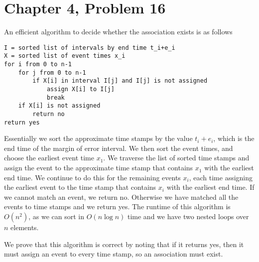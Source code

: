\documentclass[12pt]{article}
\begin{document}
\pagebreak

\section*{Chapter 4, Problem 16}

An efficient algorithm to decide whether the association exists is as follows
\begin{verbatim}
I = sorted list of intervals by end time t_i+e_i
X = sorted list of event times x_i
for i from 0 to n-1
    for j from 0 to n-1
        if X[i] in interval I[j] and I[j] is not assigned
            assign X[i] to I[j]
            break
    if X[i] is not assigned
        return no
return yes
\end{verbatim}
Essentially we sort the approximate time stamps by the value \(t_i+e_i\), which is the end time of
the margin of error interval. We then sort the event times, and choose the earliest event time \(x_1\).
We traverse the list of sorted time stamps and assign the event to the approximate time stamp that contains \(x_1\)
with the earliest end time. We continue to do this for the remaining events \(x_i\), each time assigning the earliest
event to the time stamp that contains \(x_i\) with the earliest end time. If we cannot match an event,
we return no. Otherwise we have matched all the events to time stamps and we return yes. The runtime of this algorithm is
\(O(n^2)\), as we can sort in \(O(n\log n)\) time and we have two nested loops over \(n\) elements.

We prove that this algorithm is correct by noting that if it returns yes, then it must assign an event
to every time stamp, so an association must exist.
\end{document}
